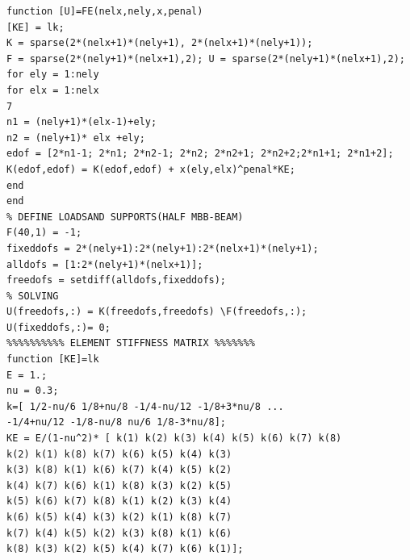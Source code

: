\documentclass{article}
\begin{document}
\begin{lstlisting}
function [U]=FE(nelx,nely,x,penal)
[KE] = lk;
K = sparse(2*(nelx+1)*(nely+1), 2*(nelx+1)*(nely+1));
F = sparse(2*(nely+1)*(nelx+1),2); U = sparse(2*(nely+1)*(nelx+1),2);
for ely = 1:nely
for elx = 1:nelx
7
n1 = (nely+1)*(elx-1)+ely;
n2 = (nely+1)* elx +ely;
edof = [2*n1-1; 2*n1; 2*n2-1; 2*n2; 2*n2+1; 2*n2+2;2*n1+1; 2*n1+2];
K(edof,edof) = K(edof,edof) + x(ely,elx)^penal*KE;
end
end
% DEFINE LOADSAND SUPPORTS(HALF MBB-BEAM)
F(40,1) = -1;
fixeddofs = 2*(nely+1):2*(nely+1):2*(nelx+1)*(nely+1);
alldofs = [1:2*(nely+1)*(nelx+1)];
freedofs = setdiff(alldofs,fixeddofs);
% SOLVING
U(freedofs,:) = K(freedofs,freedofs) \F(freedofs,:);
U(fixeddofs,:)= 0;
%%%%%%%%%% ELEMENT STIFFNESS MATRIX %%%%%%%
function [KE]=lk
E = 1.;
nu = 0.3;
k=[ 1/2-nu/6 1/8+nu/8 -1/4-nu/12 -1/8+3*nu/8 ...
-1/4+nu/12 -1/8-nu/8 nu/6 1/8-3*nu/8];
KE = E/(1-nu^2)* [ k(1) k(2) k(3) k(4) k(5) k(6) k(7) k(8)
k(2) k(1) k(8) k(7) k(6) k(5) k(4) k(3)
k(3) k(8) k(1) k(6) k(7) k(4) k(5) k(2)
k(4) k(7) k(6) k(1) k(8) k(3) k(2) k(5)
k(5) k(6) k(7) k(8) k(1) k(2) k(3) k(4)
k(6) k(5) k(4) k(3) k(2) k(1) k(8) k(7)
k(7) k(4) k(5) k(2) k(3) k(8) k(1) k(6)
k(8) k(3) k(2) k(5) k(4) k(7) k(6) k(1)];


\end{lstlisting}
\end{document}
